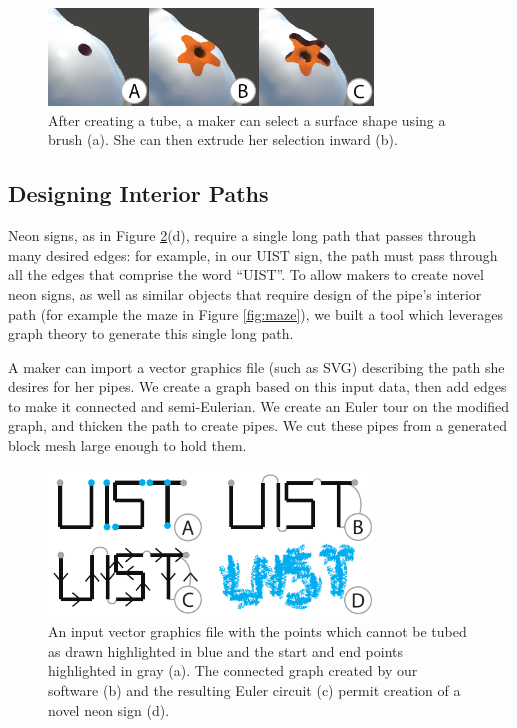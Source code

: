 \begin{figure}[h!]
\centering
    \includegraphics[width=3.4in]{figures/meshmixer-endpoint.png}
\caption{After creating a tube, a maker can select a surface shape using a brush (a).  She can then extrude her selection inward (b).}
\label{fig:meshmixer-endpoint}
\end{figure}

\subsection{Designing Interior Paths}

Neon signs, as in Figure \ref{fig:tool-process-interior}(d), require a single long path that passes through many desired edges: for example, in our UIST sign, the path must pass through all the edges that comprise the word ``UIST''.  To allow makers to create novel neon signs, as well as similar objects that require design of the pipe's interior path (for example the maze in Figure \ref{fig:maze}), we built a tool which leverages graph theory to generate this single long path.

A maker can import a vector graphics file (such as SVG) describing the path she desires for her pipes.  We create a graph based on this input data, then add edges to make it connected and semi-Eulerian.  We create an Euler tour on the modified graph, and thicken the path to create pipes.    We cut these pipes from a generated block mesh large enough to hold them.

\begin{figure}[h!]
\centering
    \includegraphics[width=3.4in]{figures/interior.pdf}
\caption{An input vector graphics file with the points which cannot be tubed as drawn highlighted in {\color{blue}blue} and the start and end points highlighted in {\color{gray}gray} (a).  The connected graph created by our software (b) and the resulting Euler circuit (c) permit creation of a novel neon sign (d). }
\label{fig:tool-process-interior}
\end{figure}

